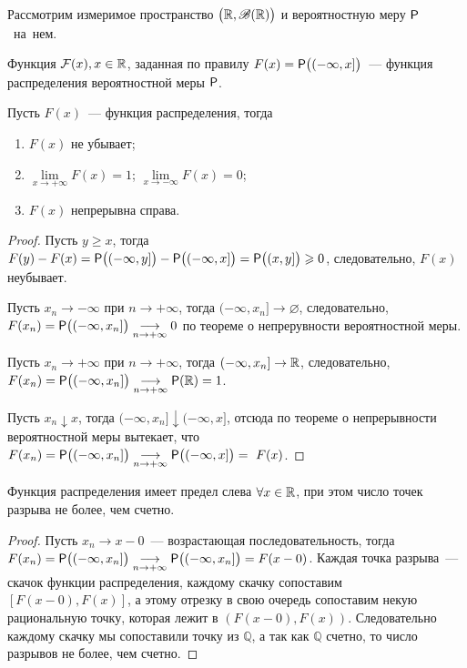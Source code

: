 Рассмотрим измеримое пространство $\big(\R, \B(\R)\big)$ и вероятностную меру $\P$~на~нем.
\begin{definition}
	Функция $\F(x), x \in \R$, заданная по правилу $F(x) = \P \big( (-\infty, x] \big)$~--- функция распределения вероятностной меры  $\P$.
\end{definition}
\begin{lemma}
	Пусть $F(x)$~--- функция распределения, тогда
	\begin{enumerate}
		\item $F(x)$ не убывает;
		\item $\lim\limits_{x \rightarrow +\infty} F(x) = 1$; $\lim\limits_{x \rightarrow -\infty} F(x) = 0$;
		\item $F(x)$ непрерывна справа.
	\end{enumerate}
	\begin{proof}
		Пусть $y \geqslant x$, тогда $F(y) - F(x) = \P \big( (-\infty, y] \big) - \P \big( (-\infty, x] \big) = \P \big( (x, y] \big) \geqslant 0$, следовательно, $F(x)$ неубывает.
		
		Пусть $x_n \rightarrow -\infty$ при $n \rightarrow +\infty$, тогда $(-\infty, x_n] \rightarrow \varnothing$, следовательно, $F(x_n) = \P \big( (-\infty, x_n] \big) \underset{n \rightarrow +\infty}{\longrightarrow} 0$ по теореме о непрерувности вероятностной меры. 
		
		Пусть $x_n \rightarrow +\infty$ при $n \rightarrow +\infty$, тогда $(-\infty, x_n] \rightarrow \R$, следовательно, $F(x_n) = \P \big( (-\infty, x_n] \big) \underset{n \rightarrow +\infty}{\longrightarrow} \P(\R) = 1$.
				
		Пусть $x_n \downarrow x$, тогда $(-\infty, x_n] \downarrow (-\infty, x]$, отсюда по теореме о непрерывности вероятностной меры вытекает, что $F(x_n) = \P \big( (-\infty, x_n] \big) \underset{n \rightarrow +\infty}{\longrightarrow} \P \big( (-\infty, x] \big) =~F(x)$.
	\end{proof}
\end{lemma}
\begin{property}
	Функция распределения имеет предел слева $\forall x \in \R$, при этом число точек разрыва не более, чем счетно.
	\begin{proof}
		Пусть $x_n \rightarrow x - 0$~--- возрастающая последовательность, тогда $F(x_n) = \P \big( (-\infty, x_n] \big) \underset{n \rightarrow +\infty}{\longrightarrow} \P \big( (-\infty, x_n] \big) = F(x - 0)$. Каждая точка разрыва~--- скачок функции распределения, каждому скачку сопоставим $[F(x-0), F(x)]$, а этому отрезку в свою очередь сопоставим некую рациональную точку, которая лежит в $(F(x-0), F(x))$. Следовательно каждому скачку мы сопоставили точку из $\mathbb{Q}$, а так как $\mathbb{Q}$ счетно, то число разрывов не более, чем счетно.
	\end{proof}
\end{property}
